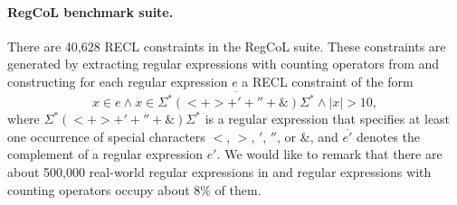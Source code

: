 \paragraph*{RegCoL benchmark suite.} There are 40,628 RECL constraints in the RegCoL suite. These constraints are generated by extracting regular expressions with counting operators from \cite{regex_lingua_franca,redos_lenka} and constructing for each regular expression $e$ a RECL constraint of the form 
$$x \in e \wedge x \in \overline{\Sigma^*(<+ >+'+''+\&)\Sigma^*} \wedge |x| > 10,$$   
where $\Sigma^*(<+ >+'+''+\&)\Sigma^*$ is a regular expression that specifies at least one occurrence of special characters $<$, $>$, $'$, $''$, or $\&$, and $\overline{e'}$ denotes the complement of a regular expression $e'$. We would like to remark that there are about 500,000 real-world regular expressions in \cite{regex_lingua_franca,redos_lenka} and regular expressions with counting operators occupy about 8\% of them. 

